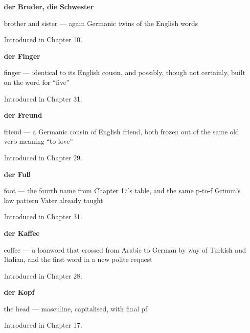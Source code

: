 \noindent\begin{minipage}[t]{\linewidth}
\raggedright
\textbf{der Bruder, die Schwester}\par
\small brother and sister — again Germanic twins of the English words\par
\footnotesize Introduced in Chapter 10.
\end{minipage}\par\medskip

\noindent\begin{minipage}[t]{\linewidth}
\raggedright
\textbf{der Finger}\par
\small finger — identical to its English cousin, and possibly, though not certainly, built on the word for \textquotedblleft{}five\textquotedblright{}\par
\footnotesize Introduced in Chapter 31.
\end{minipage}\par\medskip

\noindent\begin{minipage}[t]{\linewidth}
\raggedright
\textbf{der Freund}\par
\small friend — a Germanic cousin of English friend, both frozen out of the same old verb meaning \textquotedblleft{}to love\textquotedblright{}\par
\footnotesize Introduced in Chapter 29.
\end{minipage}\par\medskip

\noindent\begin{minipage}[t]{\linewidth}
\raggedright
\textbf{der Fuß}\par
\small foot — the fourth name from Chapter 17's table, and the same p-to-f Grimm's law pattern Vater already taught\par
\footnotesize Introduced in Chapter 31.
\end{minipage}\par\medskip

\noindent\begin{minipage}[t]{\linewidth}
\raggedright
\textbf{der Kaffee}\par
\small coffee — a loanword that crossed from Arabic to German by way of Turkish and Italian, and the first word in a new polite request\par
\footnotesize Introduced in Chapter 28.
\end{minipage}\par\medskip

\noindent\begin{minipage}[t]{\linewidth}
\raggedright
\textbf{der Kopf}\par
\small the head — masculine, capitalised, with final pf\par
\footnotesize Introduced in Chapter 17.
\end{minipage}\par\medskip

